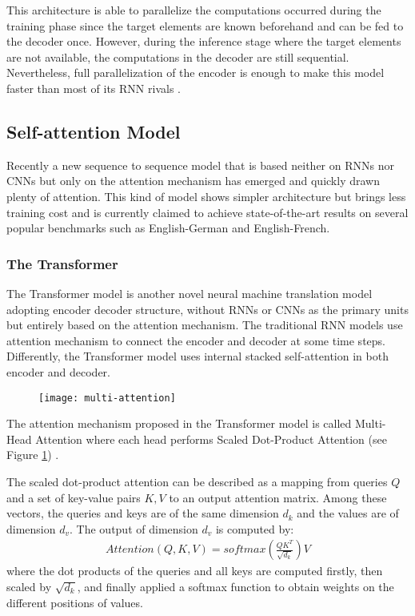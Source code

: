 This architecture is able to parallelize the computations occurred during the training phase since the target elements are known beforehand and can be fed to the decoder once. However, during the inference stage where the target elements are not available, the computations in the decoder are still sequential. Nevertheless, full parallelization of the encoder is enough to make this model faster than most of its RNN rivals \cite{gehring2017convs2s}.

\subsection{Self-attention Model}

Recently a new sequence to sequence model that is based neither on RNNs nor CNNs but only on the attention mechanism has emerged and quickly drawn plenty of attention. This kind of model shows simpler architecture but brings less training cost and is currently claimed to achieve state-of-the-art results on several popular benchmarks such as  English-German and English-French.

\subsubsection*{The Transformer}

The Transformer model \cite{Vaswani2017} is another novel neural machine translation model adopting encoder decoder structure, without RNNs or CNNs as the primary units but entirely based on the attention mechanism. The traditional RNN models use attention mechanism to connect the encoder and decoder at some time steps. Differently, the Transformer model uses internal stacked self-attention in both encoder and decoder.

\begin{figure}[h]
\texttt{[image: multi-attention]}
\centering
\caption{}
\label{figure:scaled dot-product attention}
\end{figure}

The attention mechanism proposed in the Transformer model is called Multi-Head Attention where each head performs Scaled Dot-Product Attention (see Figure \ref{figure:scaled dot-product attention}) \cite{Vaswani2017}. 

The scaled dot-product attention can be described as a mapping from queries $ Q $ and a set of key-value pairs $ K, V $ to an output attention matrix. Among these vectors, the queries and keys are of the same dimension $ d_{k} $ and the values are of dimension $ d_{v} $. The output of dimension $ d_{v} $ is computed by:
\begin{align} \label{eq:scaled-dot attention}
Attention(Q,K,V) = softmax(\frac{QK^{T}}{\sqrt{d_{k}}})V
\end{align}
where the dot products of the queries and all keys are computed firstly, then scaled by $ \sqrt{d_{k}} $, and finally applied a softmax function to obtain weights on the different positions of values.

